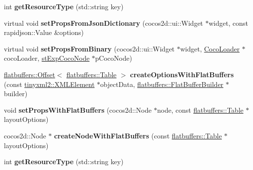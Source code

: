 \begin{DoxyCompactItemize}
int {\bfseries get\+Resource\+Type} (std\+::string key)
\item 
\mbox{\label{classcocostudio_1_1LayoutReader_a69997a7d069cd35f892dca0b2c106134}} 
virtual void {\bfseries set\+Props\+From\+Json\+Dictionary} (cocos2d\+::ui\+::\+Widget $\ast$widget, const rapidjson\+::\+Value \&options)
\item 
\mbox{\label{classcocostudio_1_1LayoutReader_a38ee75e6170eb66e4dc94ff90affcebc}} 
virtual void {\bfseries set\+Props\+From\+Binary} (cocos2d\+::ui\+::\+Widget $\ast$widget, \hyperlink{classcocostudio_1_1CocoLoader}{Coco\+Loader} $\ast$coco\+Loader, \hyperlink{structcocostudio_1_1stExpCocoNode}{st\+Exp\+Coco\+Node} $\ast$p\+Coco\+Node)
\item 
\mbox{\label{classcocostudio_1_1LayoutReader_a237a0ed7e2ade584cd49484b47b28f52}} 
\hyperlink{structflatbuffers_1_1Offset}{flatbuffers\+::\+Offset}$<$ \hyperlink{classflatbuffers_1_1Table}{flatbuffers\+::\+Table} $>$ {\bfseries create\+Options\+With\+Flat\+Buffers} (const \hyperlink{classtinyxml2_1_1XMLElement}{tinyxml2\+::\+X\+M\+L\+Element} $\ast$object\+Data, \hyperlink{classflatbuffers_1_1FlatBufferBuilder}{flatbuffers\+::\+Flat\+Buffer\+Builder} $\ast$builder)
\item 
\mbox{\label{classcocostudio_1_1LayoutReader_ae749b1054db96b2e9298c0a1420d7d90}} 
void {\bfseries set\+Props\+With\+Flat\+Buffers} (cocos2d\+::\+Node $\ast$node, const \hyperlink{classflatbuffers_1_1Table}{flatbuffers\+::\+Table} $\ast$layout\+Options)
\item 
\mbox{\label{classcocostudio_1_1LayoutReader_a7206593068855fcb5e9679667a8096cf}} 
cocos2d\+::\+Node $\ast$ {\bfseries create\+Node\+With\+Flat\+Buffers} (const \hyperlink{classflatbuffers_1_1Table}{flatbuffers\+::\+Table} $\ast$layout\+Options)
\item 
\mbox{\label{classcocostudio_1_1LayoutReader_a4ec61008f0d631ad48ae9a34934f44fb}} 
int {\bfseries get\+Resource\+Type} (std\+::string key)
\end{DoxyCompactItemize}
